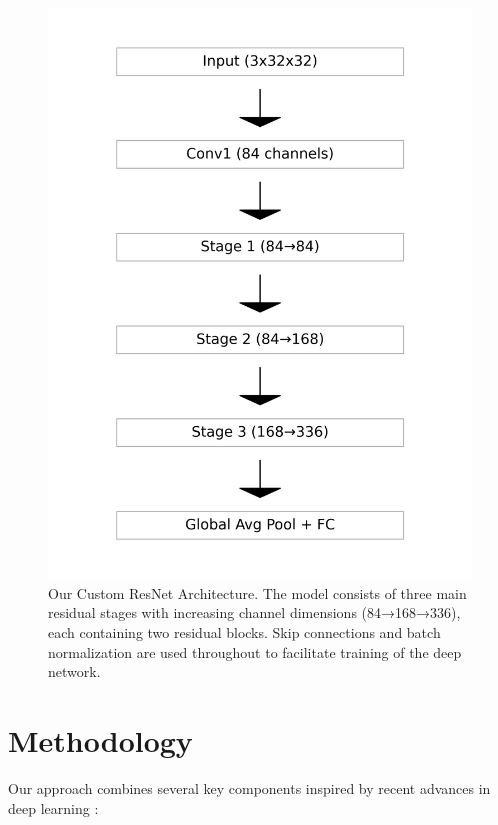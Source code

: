 \documentclass[letterpaper]{article} %
\begin{document}
\begin{figure}[t]
\centering
\includegraphics[width=0.95\columnwidth]{model_architecture.png}
\caption{Our Custom ResNet Architecture. The model consists of three main residual stages with increasing channel dimensions (84→168→336), each containing two residual blocks. Skip connections and batch normalization are used throughout to facilitate training of the deep network.}
\label{fig:architecture}
\end{figure}

\section{Methodology}
Our approach combines several key components inspired by recent advances in deep learning \cite{he2016deep, zhang2018mixup, yun2019cutmix}:
\end{document}
